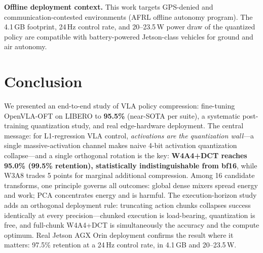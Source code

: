 \documentclass[conference]{IEEEtran}
\begin{document}
\textbf{Offline deployment context.} This work targets GPS-denied and
communication-contested environments (AFRL offline autonomy program). The 4.1\,GB
footprint, 24\,Hz control rate, and 20--23.5\,W power draw of the quantized policy are
compatible with battery-powered Jetson-class vehicles for ground and air autonomy.

\section{Conclusion}
\label{sec:conclusion}

We presented an end-to-end study of VLA policy compression: fine-tuning OpenVLA-OFT on
LIBERO to \textbf{95.5\%} (near-SOTA per suite), a systematic post-training quantization
study, and real edge-hardware deployment. The central message: for L1-regression VLA
control, \emph{activations are the quantization wall}---a single massive-activation
channel makes naive 4-bit activation quantization collapse---and a single orthogonal
rotation is the key: \textbf{W4A4+DCT reaches 95.0\% (99.5\% retention), statistically
indistinguishable from bf16}, while W3A8 trades 5 points for marginal additional
compression. Among 16 candidate transforms, one principle governs all outcomes: global
dense mixers spread energy and work; PCA concentrates energy and is harmful. The
execution-horizon study adds an orthogonal deployment rule: truncating action chunks
collapses success identically at every precision---chunked execution is load-bearing,
quantization is free, and full-chunk W4A4+DCT is simultaneously the accuracy and the
compute optimum. Real Jetson AGX Orin deployment confirms the result where it matters:
97.5\% retention at a 24\,Hz control rate, in 4.1\,GB and 20--23.5\,W.

\end{document}
